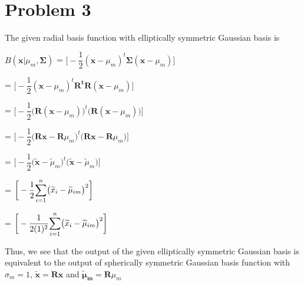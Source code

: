 \documentclass[11pt]{article}
\begin{document}
\begin{center}

\ \\
\end{center}

\section*{Problem 3}

\vspace{5 mm}
\noindent

The given radial basis function with elliptically symmetric Gaussian basis is

$B(\mathbf{x}|\mu_m,\boldsymbol \Sigma)$ 
=  $\bigg[  -\dfrac{1}{2}(\mathbf{x} - 
\mu_{m} )^t\boldsymbol \Sigma (\mathbf{x} - \mu_{m} )    \bigg]$

= $\bigg[  -\dfrac{1}{2}(\mathbf{x} - 
\mu_{m} )^t\mathbf {R^tR} (\mathbf{x} - \mu_{m} )    \bigg]$


=  $\bigg[  -\dfrac{1}{2}\bigg(\mathbf {R}(\mathbf{x} - 
\mu_{m} )\bigg)^t \bigg(\mathbf {R}(\mathbf{x} - \mu_{m}) \bigg)    \bigg]$ 


=  $\bigg[  -\dfrac{1}{2}\bigg(\mathbf {R}\mathbf{x} - 
\mathbf {R}\mu_{m} \bigg)^t \bigg(\mathbf {R}\mathbf{x} - 
\mathbf {R}\mu_{m} \bigg)  \bigg]$ 


=  $\bigg[  -\dfrac{1}{2}\bigg(\widetilde{\mathbf{x}} - 
\widetilde\mu_m  \bigg)^t \bigg(\widetilde{\mathbf{x}} - 
\widetilde\mu_m  \bigg)  \bigg]$ 


=  $\bigg[  -\dfrac{1}{2}\mathlarger{\sum}_{i = 1}^{n}\big(\widetilde{x}_i - 
\widetilde {\mu}_{im} \big)^2 \bigg]$ 


=  $\bigg[  -\dfrac{1}{2(1)^2}\mathlarger{\sum}_{i = 1}^{n}\big(\widetilde{x}_i - 
\widetilde {\mu}_{im} \big)^2 \bigg]$ 


\vspace{5 mm}
\noindent
Thus, we see that the output of the given elliptically symmetric Gaussian basis is
equivalent to the output of spherically symmetric Gaussian
basis function  with $\sigma_m = 1$, $\widetilde{\mathbf{x}} = \mathbf {R}\mathbf{x} $
and $\mathbf{\widetilde\mu_m} = \mathbf {R}\mu_{m}$
\end{document}
